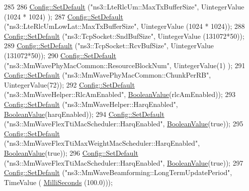 \begin{DoxyCode}
285 
286         \hyperlink{group__config_ga2e7882df849d8ba4aaad31c934c40c06}{Config::SetDefault} (\textcolor{stringliteral}{"ns3::LteRlcUm::MaxTxBufferSize"}, UintegerValue (1024 * 1024)
      );
287         \hyperlink{group__config_ga2e7882df849d8ba4aaad31c934c40c06}{Config::SetDefault} (\textcolor{stringliteral}{"ns3::LteRlcUmLowLat::MaxTxBufferSize"}, UintegerValue (1024 *
       1024));
288         \hyperlink{group__config_ga2e7882df849d8ba4aaad31c934c40c06}{Config::SetDefault} (\textcolor{stringliteral}{"ns3::TcpSocket::SndBufSize"}, UintegerValue (131072*50));
289         \hyperlink{group__config_ga2e7882df849d8ba4aaad31c934c40c06}{Config::SetDefault} (\textcolor{stringliteral}{"ns3::TcpSocket::RcvBufSize"}, UintegerValue (131072*50));
290         \hyperlink{group__config_ga2e7882df849d8ba4aaad31c934c40c06}{Config::SetDefault} (\textcolor{stringliteral}{"ns3::MmWavePhyMacCommon::ResourceBlockNum"}, UintegerValue(1)
      );
291         \hyperlink{group__config_ga2e7882df849d8ba4aaad31c934c40c06}{Config::SetDefault} (\textcolor{stringliteral}{"ns3::MmWavePhyMacCommon::ChunkPerRB"}, UintegerValue(72));
292         \hyperlink{group__config_ga2e7882df849d8ba4aaad31c934c40c06}{Config::SetDefault} (\textcolor{stringliteral}{"ns3::MmWaveHelper::RlcAmEnabled"}, 
      \hyperlink{classns3_1_1BooleanValue}{BooleanValue}(rlcAmEnabled));
293         \hyperlink{group__config_ga2e7882df849d8ba4aaad31c934c40c06}{Config::SetDefault} (\textcolor{stringliteral}{"ns3::MmWaveHelper::HarqEnabled"}, 
      \hyperlink{classns3_1_1BooleanValue}{BooleanValue}(harqEnabled));
294         \hyperlink{group__config_ga2e7882df849d8ba4aaad31c934c40c06}{Config::SetDefault} (\textcolor{stringliteral}{"ns3::MmWaveFlexTtiMacScheduler::HarqEnabled"}, 
      \hyperlink{classns3_1_1BooleanValue}{BooleanValue}(\textcolor{keyword}{true}));
295         \hyperlink{group__config_ga2e7882df849d8ba4aaad31c934c40c06}{Config::SetDefault} (\textcolor{stringliteral}{"ns3::MmWaveFlexTtiMaxWeightMacScheduler::HarqEnabled"}, 
      \hyperlink{classns3_1_1BooleanValue}{BooleanValue}(\textcolor{keyword}{true}));
296         \hyperlink{group__config_ga2e7882df849d8ba4aaad31c934c40c06}{Config::SetDefault} (\textcolor{stringliteral}{"ns3::MmWaveFlexTtiMacScheduler::HarqEnabled"}, 
      \hyperlink{classns3_1_1BooleanValue}{BooleanValue}(\textcolor{keyword}{true}));
297         \hyperlink{group__config_ga2e7882df849d8ba4aaad31c934c40c06}{Config::SetDefault} (\textcolor{stringliteral}{"ns3::MmWaveBeamforming::LongTermUpdatePeriod"}, TimeValue (
      \hyperlink{group__timecivil_gaf26127cf4571146b83a92ee18679c7a9}{MilliSeconds} (100.0)));

\end{DoxyCode}
